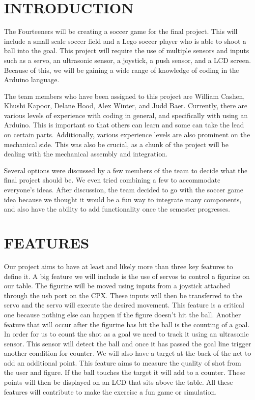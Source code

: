 \documentclass[12pt]{article}
\begin{document}
\section{INTRODUCTION}
The Fourteeners will be creating a soccer game for the final project. This will include a small scale soccer field and a Lego soccer player who is able to shoot a ball into the goal. This project will require the use of multiple sensors and inputs such as a servo, an ultrasonic sensor, a joystick, a push sensor, and a LCD screen. Because of this, we will be gaining a wide range of knowledge of coding in the Arduino language.

The team members who have been assigned to this project are William Cashen, Khushi Kapoor, Delane Hood, Alex Winter, and Judd Baer. Currently, there are various levels of experience with coding in general, and specifically with using an Arduino. This is important so that others can learn and some can take the lead on certain parts. Additionally, various experience levels are also prominent on the mechanical side. This was also be crucial, as a chunk of the project will be dealing with the mechanical assembly and integration.

Several options were discussed by a few members of the team to decide what the final project should be. We even tried combining a few to accommodate everyone's ideas. After discussion, the team decided to go with the soccer game idea because we thought it would be a fun way to integrate many components, and also have the ability to add functionality once the semester progresses.
\section{FEATURES}
Our project aims to have at least and likely more than three key features to define it. A big feature we will include is the use of servos to control a figurine on our table. The figurine will be moved using inputs from a joystick attached through the usb port on the CPX. These inputs will then be transferred to the servo and the servo will execute the desired movement. This feature is a critical one because nothing else can happen if the figure doesn't hit the ball. Another feature that will occur after the figurine has hit the ball is the counting of a goal. In order for us to count the shot as a goal we need to track it using an ultrasonic sensor. This sensor will detect the ball and once it has passed the goal line trigger another condition for counter. We will also have a target at the back of the net to add an additional point. This feature aims to measure the quality of shot from the user and figure. If the ball touches the target it will add to a counter. These points will then be displayed on an LCD that sits above the table. All these features will contribute to make the exercise a fun game or simulation. 
\end{document}
